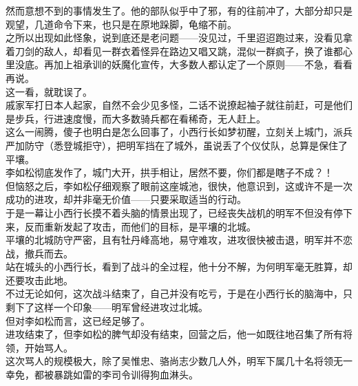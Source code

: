 \begin{multicols}{\theparacolNo}
然而意想不到的事情发生了。他的部队似乎中了邪，有的往前冲了，大部分却只是观望，几道命令下来，也只是在原地跺脚，龟缩不前。\\

之所以出现如此怪象，说到底还是老问题——没见过，千里迢迢跑过来，没看见拿着刀剑的敌人，却看见一群衣着怪异在路边又唱又跳，混似一群疯子，换了谁都心里没底。再加上祖承训的妖魔化宣传，大多数人都认定了一个原则——不急，看看再说。\\

这一看，就耽误了。\\

戚家军打日本人起家，自然不会少见多怪，二话不说撩起袖子就往前赶，可是他们是步兵，行进速度慢，而大多数骑兵都在看稀奇，无人赶上。\\

这么一闹腾，傻子也明白是怎么回事了，小西行长如梦初醒，立刻关上城门，派兵严加防守（悉登城拒守），把明军挡在了城外，虽说丢了个仪仗队，总算是保住了平壤。\\

李如松彻底发作了，城门大开，拱手相让，居然不要，你们都是瞎子不成？！\\

但恼怒之后，李如松仔细观察了眼前这座城池，很快，他意识到，这或许不是一次成功的进攻，却并非毫无价值——只要采取适当的行动。\\

于是一幕让小西行长摸不着头脑的情景出现了，已经丧失战机的明军不但没有停下来，反而重新发起了攻击，而他们的目标，是平壤的北城。\\

平壤的北城防守严密，且有牡丹峰高地，易守难攻，进攻很快被击退，明军并不恋战，撤兵而去。\\

站在城头的小西行长，看到了战斗的全过程，他十分不解，为何明军毫无胜算，却还要攻击此地。\\

不过无论如何，这次战斗结束了，自己并没有吃亏，于是在小西行长的脑海中，只剩下了这样一个印象——明军曾经进攻过北城。\\

但对李如松而言，这已经足够了。\\

进攻结束了，但李如松的脾气却没有结束，回营之后，他一如既往地召集了所有将领，开始骂人。\\

这次骂人的规模极大，除了吴惟忠、骆尚志少数几人外，明军下属几十名将领无一幸免，都被暴跳如雷的李司令训得狗血淋头。\\


\end{multicols}
